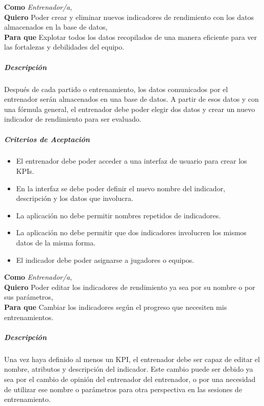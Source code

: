\begin{tcolorbox}[title=Creación de nuevos KPIs]
\textbf{Como} \textit{Entrenador/a},\\
\textbf{Quiero} Poder crear y eliminar nuevos indicadores de rendimiento con los datos almacenados en la base de datos,\\
\textbf{Para que} Explotar todos los datos recopilados de una manera eficiente para ver las fortalezas y debilidades del equipo.
\end{tcolorbox}

\subparagraph{Descripción}
Después de cada partido o entrenamiento, los datos comunicados por el entrenador serán almacenados en una base de datos. A partir de esos datos y con una fórmula general, el entrenador debe poder elegir dos datos y crear un nuevo indicador de rendimiento para ser evaluado.

\subparagraph{Criterios de Aceptación}
\begin{itemize}
    \item El entrenador debe poder acceder a una interfaz de usuario para crear los KPIs.
    \item En la interfaz se debe poder definir el nuevo nombre del indicador, descripción y los datos que involucra.
    \item La aplicación no debe permitir nombres repetidos de indicadores.
    \item La aplicación no debe permitir que dos indicadores involucren los mismos datos de la misma forma.
    \item El indicador debe poder asignarse a jugadores o equipos.
\end{itemize}

\begin{tcolorbox}[title=Edición de KPIs]
\textbf{Como} \textit{Entrenador/a},\\
\textbf{Quiero} Poder editar los indicadores de rendimiento ya sea por su nombre o por sus parámetros,\\
\textbf{Para que} Cambiar los indicadores según el progreso que necesiten mis entrenamientos.
\end{tcolorbox}

\subparagraph{Descripción}
Una vez haya definido al menos un KPI, el entrenador debe ser capaz de editar el nombre, atributos y descripción del indicador. Este cambio puede ser debido ya sea por el cambio de opinión del entrenador del entrenador, o por una necesidad de utilizar ese nombre o parámetros para otra perspectiva en las sesiones de entrenamiento.

